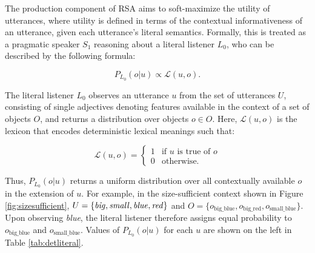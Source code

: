\documentclass[11pt]{article}
\newcommand{\denote}[1]{\mbox{ $[\![ #1 ]\!]$}}
\newcommand{\tableref}[1]{Table \ref{#1}}
\newcommand{\figref}[1]{Figure \ref{#1}}
\begin{document}
The production component of RSA aims to soft-maximize the utility of utterances, where utility is defined in terms of the contextual informativeness of an utterance, given each utterance's literal semantics. Formally, this is treated as a pragmatic speaker $S_1$ reasoning about a literal listener $L_0$, who can be described by the following formula:

\begin{equation}
P_{L_0}(o | u) \propto \mathcal{L}(u,o).
\end{equation}


The literal listener $L_0$ observes an utterance $u$ from the set of  utterances $U$, consisting of single adjectives denoting features available in the context of a set of objects  $O$, and returns a distribution over objects $o \in O$. Here, $\mathcal{L}(u,o)$ is the lexicon that encodes deterministic lexical meanings such that: 

\begin{equation}
\mathcal{L}(u,o) = \left\{
 \begin{array}{rl}
  1 & \text{if } u \text{ is true of } o\\
   0 & \text{otherwise}.
 \end{array} \right.
\end{equation}

 Thus, $P_{L_0}(o | u)$ returns a uniform distribution over all contextually available $o$ in the extension of $u$. For example, in the size-sufficient context shown in \figref{fig:sizesufficient}, $U = \{\textrm{\emph{big}}, \textrm{\emph{small}}, \textrm{\emph{blue}}, \textrm{\emph{red}}\}$ and $O = \{o_{\textrm{big\_blue}}, o_{\textrm{big\_red}}, o_{\textrm{small\_blue}}\}$. Upon observing \emph{blue}, the literal listener therefore assigns equal probability to  $o_{\textrm{big\_blue}}$ and $o_{\textrm{small\_blue}}$. Values of $P_{L_0}(o | u)$ for each $u$ are shown on the left in \tableref{tab:detliteral}.
\end{document}
